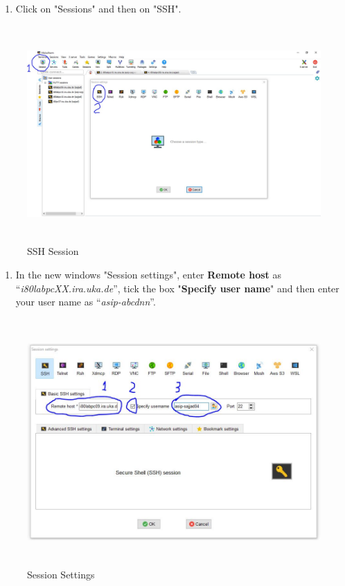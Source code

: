 \begin{enumerate}
	\def\labelenumi{\arabic{enumi}.}
	\setcounter{enumi}{2}
	\item
	Click on "Sessions" and then on "SSH".
\end{enumerate}
\begin{figure}
	\centering
	\includegraphics[width=5.73515in,height=3.25226in]{src/images/image14.JPG}
	\caption{SSH Session}
	\label{fig:fig14}
\end{figure}
\begin{enumerate}
	\def\labelenumi{\arabic{enumi}.}
	\setcounter{enumi}{3}
	\item
	In the new windows "Session settings", enter \textbf{Remote host} as
	``\emph{i80labpcXX.ira.uka.de}'', tick the box "\textbf{Specify user
		name}" and then enter your user name as ``\emph{asip-abcdnn}''.
\end{enumerate}
\begin{figure}
	\centering
	\includegraphics[width=5.53861in,height=3.70864in]{src/images/image15.JPG}
	\caption{Session Settings}
	\label{fig:fig15}
\end{figure}
